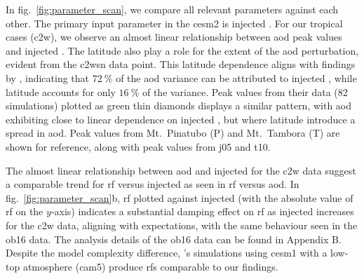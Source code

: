\documentclass{ametsocV6.1}
\newcommand{\iso}[1][i]{{#1}njected \ce{SO2}}
\begin{document}
In fig.~\ref{fig:parameter_scan}, we compare all relevant parameters against each other.
The primary input parameter in the \gls{cesm2} is \iso{}. For our tropical cases
(\gls{c2w}), we observe an almost linear relationship between \gls{aod} peak values and
\iso{}. The latitude also play a role for the extent of the \gls{aod} perturbation,
evident from the \gls{c2wsn} data point. This latitude dependence aligns with findings
by \citet{marshall2019}, indicating that \(\SI{72}{\percent}\) of the \gls{aod} variance
can be attributed to \iso{}, while latitude accounts for only \(\SI{16}{\percent}\) of
the variance. Peak values from their data (82 simulations) plotted as green thin
diamonds displays a similar pattern, with \gls{aod} exhibiting close to linear
dependence on \iso{}, but where latitude introduce a spread in \gls{aod}. Peak values
from Mt.\ Pinatubo (P) and Mt.\ Tambora (T) are shown for reference, along with peak
values from \gls{j05} and \gls{t10}.

The almost linear relationship between \gls{aod} and \iso{} for the \gls{c2w} data
suggest a comparable trend for \gls{rf} versus \iso{} as seen in \gls{rf} versus
\gls{aod}. In fig.~\ref{fig:parameter_scan}b, \gls{rf} plotted against \iso{} (with the
absolute value of \gls{rf} on the \(y\)-axis) indicates a substantial damping effect on
\gls{rf} as \iso{} increases for the \gls{c2w} data, aligning with expectations, with
the same behaviour seen in the \gls{ob16} data. The analysis details of the \gls{ob16}
data can be found in Appendix B. Despite the model complexity difference,
\citet{ottobliesner2016}'s simulations using \gls{cesm1} with a low-top atmosphere
(\gls{cam5}) produce \glspl{rf} comparable to our findings.
\end{document}
